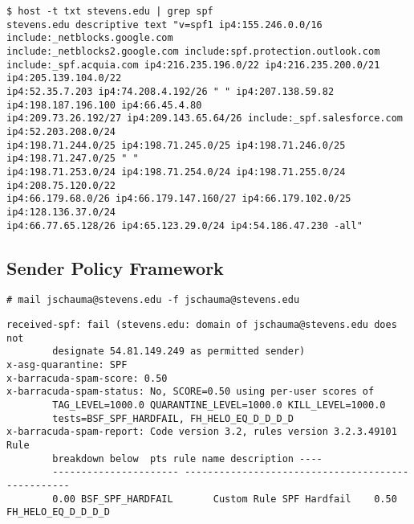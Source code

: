 \documentclass[xga]{xdvislides}
\begin{document}
\begin{verbatim}
$ host -t txt stevens.edu | grep spf
stevens.edu descriptive text "v=spf1 ip4:155.246.0.0/16 include:_netblocks.google.com
include:_netblocks2.google.com include:spf.protection.outlook.com
include:_spf.acquia.com ip4:216.235.196.0/22 ip4:216.235.200.0/21 ip4:205.139.104.0/22
ip4:52.35.7.203 ip4:74.208.4.192/26 " " ip4:207.138.59.82 ip4:198.187.196.100 ip4:66.45.4.80
ip4:209.73.26.192/27 ip4:209.143.65.64/26 include:_spf.salesforce.com ip4:52.203.208.0/24
ip4:198.71.244.0/25 ip4:198.71.245.0/25 ip4:198.71.246.0/25 ip4:198.71.247.0/25 " "
ip4:198.71.253.0/24 ip4:198.71.254.0/24 ip4:198.71.255.0/24 ip4:208.75.120.0/22
ip4:66.179.68.0/26 ip4:66.179.147.160/27 ip4:66.179.102.0/25 ip4:128.136.37.0/24
ip4:66.77.65.128/26 ip4:65.123.29.0/24 ip4:54.186.47.230 -all"
\end{verbatim}

\subsection{Sender Policy Framework}
\begin{verbatim}
# mail jschauma@stevens.edu -f jschauma@stevens.edu 
\end{verbatim}
\vspace{.25in}
\begin{verbatim}
received-spf: fail (stevens.edu: domain of jschauma@stevens.edu does not                            
        designate 54.81.149.249 as permitted sender)
x-asg-quarantine: SPF
x-barracuda-spam-score: 0.50
x-barracuda-spam-status: No, SCORE=0.50 using per-user scores of
        TAG_LEVEL=1000.0 QUARANTINE_LEVEL=1000.0 KILL_LEVEL=1000.0
        tests=BSF_SPF_HARDFAIL, FH_HELO_EQ_D_D_D_D                                                
x-barracuda-spam-report: Code version 3.2, rules version 3.2.3.49101    Rule
        breakdown below  pts rule name description ----
        ---------------------- --------------------------------------------------
        0.00 BSF_SPF_HARDFAIL       Custom Rule SPF Hardfail    0.50 FH_HELO_EQ_D_D_D_D
\end{verbatim}
\end{document}
